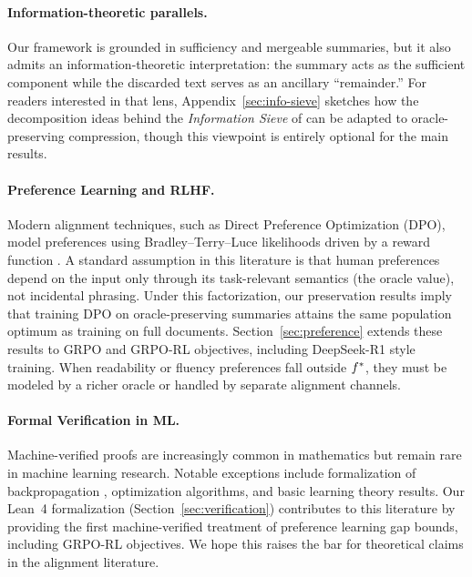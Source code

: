 \paragraph{Information-theoretic parallels.}
Our framework is grounded in sufficiency and mergeable summaries, but it also admits an information-theoretic interpretation: the summary acts as the sufficient component while the discarded text serves as an ancillary ``remainder.'' For readers interested in that lens, Appendix~\ref{sec:info-sieve} sketches how the decomposition ideas behind the \emph{Information Sieve} of \citet{steeg2016informationsieve} can be adapted to oracle-preserving compression, though this viewpoint is entirely optional for the main results.

\paragraph{Preference Learning and RLHF.}
Modern alignment techniques, such as Direct Preference Optimization (DPO), model preferences using Bradley--Terry--Luce likelihoods driven by a reward function \citep{BradleyTerry1952,RafailovEtAl2023DPO}. A standard assumption in this literature is that human preferences depend on the input only through its task-relevant semantics (the oracle value), not incidental phrasing. Under this factorization, our preservation results imply that training DPO on oracle-preserving summaries attains the same population optimum as training on full documents. Section~\ref{sec:preference} extends these results to GRPO and GRPO-RL objectives, including DeepSeek-R1 style training. When readability or fluency preferences fall outside $f^{\ast}$, they must be modeled by a richer oracle or handled by separate alignment channels.

\paragraph{Formal Verification in ML.}
Machine-verified proofs are increasingly common in mathematics but remain rare in machine learning research. Notable exceptions include formalization of backpropagation \citep{huet2021backprop}, optimization algorithms, and basic learning theory results. Our Lean~4 formalization (Section~\ref{sec:verification}) contributes to this literature by providing the first machine-verified treatment of preference learning gap bounds, including GRPO-RL objectives. We hope this raises the bar for theoretical claims in the alignment literature.

